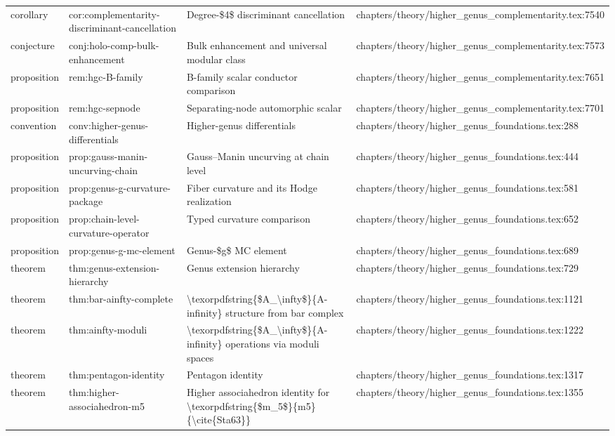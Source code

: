 \documentclass[11pt]{article}
\begin{document}
\begin{longtable}{L{0.10\textwidth}L{0.26\textwidth}L{0.42\textwidth}L{0.22\textwidth}}
corollary & cor:complementarity-discriminant-cancellation & Degree-\$4\$ discriminant cancellation & chapters/theory/higher\_genus\_complementarity.tex:7540\\
conjecture & conj:holo-comp-bulk-enhancement & Bulk enhancement and universal modular class & chapters/theory/higher\_genus\_complementarity.tex:7573\\
proposition & rem:hgc-B-family & B-family scalar conductor comparison & chapters/theory/higher\_genus\_complementarity.tex:7651\\
proposition & rem:hgc-sepnode & Separating-node automorphic scalar & chapters/theory/higher\_genus\_complementarity.tex:7701\\
convention & conv:higher-genus-differentials & Higher-genus differentials & chapters/theory/higher\_genus\_foundations.tex:288\\
proposition & prop:gauss-manin-uncurving-chain & Gauss--Manin uncurving at chain level & chapters/theory/higher\_genus\_foundations.tex:444\\
proposition & prop:genus-g-curvature-package & Fiber curvature and its Hodge realization & chapters/theory/higher\_genus\_foundations.tex:581\\
proposition & prop:chain-level-curvature-operator & Typed curvature comparison & chapters/theory/higher\_genus\_foundations.tex:652\\
proposition & prop:genus-g-mc-element & Genus-\$g\$ MC element & chapters/theory/higher\_genus\_foundations.tex:689\\
theorem & thm:genus-extension-hierarchy & Genus extension hierarchy & chapters/theory/higher\_genus\_foundations.tex:729\\
theorem & thm:bar-ainfty-complete & \textbackslash{}texorpdfstring\{\$A\_\textbackslash{}infty\$\}\{A-infinity\} structure from bar complex & chapters/theory/higher\_genus\_foundations.tex:1121\\
theorem & thm:ainfty-moduli & \textbackslash{}texorpdfstring\{\$A\_\textbackslash{}infty\$\}\{A-infinity\} operations via moduli spaces & chapters/theory/higher\_genus\_foundations.tex:1222\\
theorem & thm:pentagon-identity & Pentagon identity & chapters/theory/higher\_genus\_foundations.tex:1317\\
theorem & thm:higher-associahedron-m5 & Higher associahedron identity for \textbackslash{}texorpdfstring\{\$m\_5\$\}\{m5\} \{\textbackslash{}cite\{Sta63\}\} & chapters/theory/higher\_genus\_foundations.tex:1355\\

\end{longtable}
\end{document}

